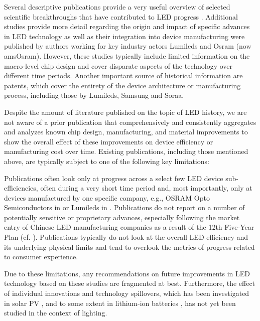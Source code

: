 \documentclass[parskip=full]{article}
\begin{document}
Several descriptive publications provide a very useful overview of selected scientific breakthroughs that have contributed to LED progress \cite{krames2007status,Phillips2007,Bierhuizen2007,Nakamura2013,feezell2018invention,Taki2019}. Additional studies provide more detail regarding the origin and impact of specific advances in LED technology as well as their integration into device manufacturing were published by authors working for key industry actors Lumileds\cite{MuellerMach2005,Shchekin2006,lumi2015lumi,Bhardwaj2017} and Osram (now amsOsram)\cite{Haerle2004,Baur2009,laubsch2009high,hahn2014development}. However, these studies typically include limited information on the macro-level chip design and cover disparate aspects of the technology over different time periods. Another important source of historical information are patents, which cover the entirety of the device architecture or manufacturing process, including those by Lumileds\cite{margalith2011thin}, Samsung\cite{jung2014phos,cha2019semiconductor} and Soraa\cite{cich2017high}.

Despite the amount of literature published on the topic of LED history, we are not aware of a prior publication that comprehensively and consistently aggregates and analyzes known chip design, manufacturing, and material improvements to show the overall effect of these improvements on device efficiency or manufacturing cost over time. Existing publications, including those mentioned above, are typically subject to one of the following key limitations:

Publications often look only at progress across a select few LED device sub-efficiencies, often during a very short time period and, most importantly, only at devices manufactured by one specific company, e.g., OSRAM Opto Semiconductors in \cite{hahn2014development} or Lumileds in \cite{Bhardwaj2017}. Publications do not report on a number of potentially sensitive or proprietary advances, especially following the market entry of Chinese LED manufacturing companies as a result of the 12th Five-Year Plan (cf. \cite{guo2017china}). Publications typically do not look at the overall LED efficiency and its underlying physical limits and tend to overlook the metrics of progress related to consumer experience. 

Due to these limitations, any recommendations on future improvements in LED technology based on these studies are fragmented at best. Furthermore, the effect of individual innovations and technology spillovers, which has been investigated in solar PV \cite{kavlak2018evaluating,kolesnikov2021spillovers,nemet2019solar}, and to some extent in lithium-ion batteries \cite{Stephan2021}, has not yet been studied in the context of lighting.
\end{document}

